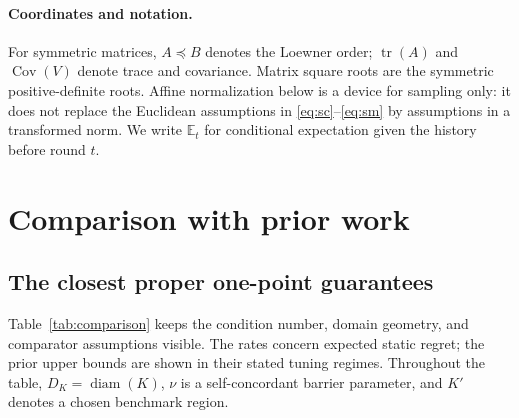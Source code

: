 \documentclass[11pt]{article}
\numberwithin{equation}{section}
\newcommand{\E}{\mathbb E}
\newcommand{\Cov}{\operatorname{Cov}}
\newcommand{\tr}{\operatorname{tr}}
\newcommand{\diam}{\operatorname{diam}}
\theoremstyle{definition}
\theoremstyle{remark}
\begin{document}
\paragraph{Coordinates and notation.}
For symmetric matrices, $A\preceq B$ denotes the Loewner order; $\tr(A)$ and
$\Cov(V)$ denote trace and covariance. Matrix square roots are the symmetric
positive-definite roots. Affine normalization below is a device for sampling
only: it does not replace the Euclidean assumptions in
\eqref{eq:sc}--\eqref{eq:sm} by assumptions in a transformed norm. We write
$\E_t$ for conditional expectation given the history before round $t$.

\section{Comparison with prior work}\label{sec:related}
\subsection{The closest proper one-point guarantees}
Table~\ref{tab:comparison} keeps the condition number, domain geometry, and
comparator assumptions visible. The rates concern expected static regret;
the prior upper bounds are shown in their stated tuning regimes. Throughout
the table, $D_K=\diam(K)$, $\nu$ is a self-concordant barrier parameter, and
$K'$ denotes a chosen benchmark region.
\end{document}

